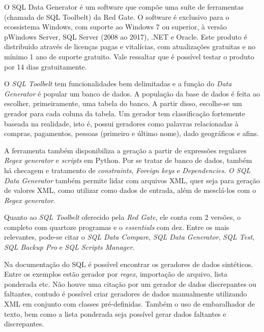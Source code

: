 \documentclass[
	12pt,				%
	openright,			%
	oneside,			%
	a4paper,			%
	english,			%
	brazil				%
	]{abntex2}
\begin{document}
		O SQL Data Generator \cite{RedgateSQLDataGenerator} é um software que compõe uma suíte de ferramentas (chamada de SQL Toolbelt) da Red Gate.
		O software é exclusivo para o ecossistema Windows, com suporte ao Windows 7 ou superior, à versão pWindows Server, SQL Server (2008 ao 2017), .NET e Oracle.
		Este produto é distribuido através de licenças pagas e vitalícias, com atualizações gratuitas e no mínimo 1 ano de suporte gratuito.
		Vale ressaltar que é possível testar o produto por 14 dias gratuitamente.
		\par
		O \emph{SQL Toolbelt} tem funcionalidades bem delimitadas e a função do \emph{Data Generator} é popular um banco de dados. 
		A população da base de dados é feita ao escolher, primeiramente, uma tabela do banco.
		A partir disso, escolhe-se um gerador para cada coluna da tabela.
		Um gerador tem classificação fortemente baseada na realidade, isto é, possui geradores como palavras relacionadas à compras, pagamentos, pessoas (primeiro e último nome), dado geográficos e afins.
		\par
		A ferramenta também disponibiliza a geração a partir de expressões regulares \emph{Regex generator} e \emph{scripts} em Python.
		Por se tratar de banco de dados, também há checagem e tratamento de \emph{constraints}, \emph{Foreign keys} e \emph{Dependencies}.
		\emph{O SQL Data Generator} também permite lidar com arquivos XML, quer seja para geração de valores XML, como utilizar como dados de entrada, além de mesclá-los com o \emph{Regex generator}.
		\par
		Quanto ao \emph{SQL Toolbelt} oferecido pela \emph{Red Gate}, ele conta com 2 versões, o completo com quartoze programas e o \emph{essentials} com dez.
		Entre os mais relevantes, pode-se citar o \emph{SQL Data Compare}, \emph{SQL Data Generator}, \emph{SQL Test}, \emph{SQL Backup Pro} e \emph{SQL Scripts Manager}.
		\par
		Na documentação do SQL \cite{RedgateSQLDataGeneratorDoc} é possível encontrar os geradores de dados sintéticos.
		Entre os exemplos estão gerador por \emph{regex}, importação de arquivo, lista ponderada etc.
		Não houve uma citação por um gerador de dados discrepantes ou faltantes,
		 contudo é possível criar geradores de dados manualmente utilizando XML em conjunto com classes pré-definidas.
		Também o uso de embaralhador de texto, bem como a lista ponderada seja possível gerar dados faltantes e discrepantes.
\end{document}
